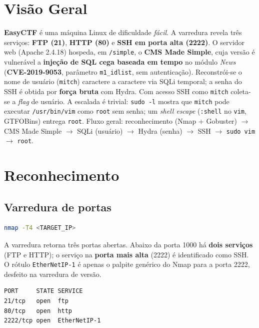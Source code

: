 \documentclass[12pt,a4paper]{article}
\newcommand{\cmd}[1]{\lstinline[style=shell]|#1|}
\begin{document}
\section{Visão Geral}
\textbf{EasyCTF} é uma máquina Linux de dificuldade \emph{fácil}. A varredura
revela três serviços: \textbf{FTP (21)}, \textbf{HTTP (80)} e \textbf{SSH em
porta alta (2222)}. O servidor web (Apache 2.4.18) hospeda, em \texttt{/simple},
o \textbf{CMS Made Simple}, cuja versão é vulnerável a \textbf{injeção de SQL
cega baseada em tempo} no módulo \emph{News} (\textbf{CVE-2019-9053}, parâmetro
\texttt{m1\_idlist}, sem autenticação). Reconstrói-se o nome de usuário
(\texttt{mitch}) caractere a caractere via SQLi temporal; a senha do SSH é obtida
por \textbf{força bruta} com Hydra. Com acesso SSH como \texttt{mitch} coleta-se
a \emph{flag} de usuário. A escalada é trivial: \cmd{sudo -l} mostra que
\texttt{mitch} pode executar \texttt{/usr/bin/vim} como \texttt{root} sem senha;
um \emph{shell escape} (\texttt{:shell} no \texttt{vim}, GTFOBins) entrega
\texttt{root}. Fluxo geral: reconhecimento (Nmap + Gobuster) $\rightarrow$ CMS
Made Simple $\rightarrow$ SQLi (usuário) $\rightarrow$ Hydra (senha)
$\rightarrow$ SSH $\rightarrow$ \texttt{sudo vim} $\rightarrow$ \texttt{root}.

\section{Reconhecimento}

\subsection{Varredura de portas}
\begin{lstlisting}[language=bash,caption={Varredura inicial de portas com Nmap.}]
nmap -T4 <TARGET_IP>
\end{lstlisting}

A varredura retorna três portas abertas. Abaixo da porta 1000 há
\textbf{dois serviços} (FTP e HTTP); o serviço na \textbf{porta mais alta}
(2222) é identificado como SSH. O rótulo \texttt{EtherNetIP-1} é apenas o palpite
genérico do Nmap para a porta 2222, desfeito na varredura de versão.

\begin{lstlisting}[style=output,caption={Portas abertas retornadas pela varredura.}]
PORT     STATE SERVICE
21/tcp   open  ftp
80/tcp   open  http
2222/tcp open  EtherNetIP-1
\end{lstlisting}
\end{document}
